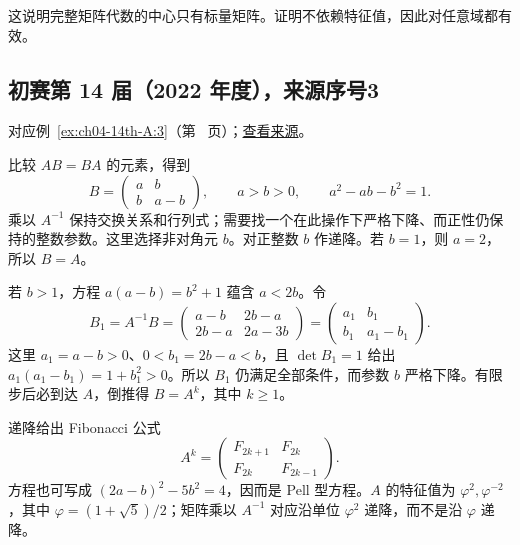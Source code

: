 \documentclass[UTF8,12pt,a4paper,fontset=fandol]{ctexart}
\begin{document}
\begin{remark}[方法与条件]

这说明完整矩阵代数的中心只有标量矩阵。证明不依赖特征值，因此对任意域都有效。

\end{remark}

\subsection{初赛第 14 届（2022 年度），来源序号3}\label{ans:ch04-14th-A:3}\label{pr:ch04-14th-A:3}

对应例~\ref{ex:ch04-14th-A:3}（第~\pageref{ex:ch04-14th-A:3} 页）；\href{https://github.com/lzxcr/cmc-mathematics/blob/64916fa1fdbc3e444a652eca204d5669058ee321/src/problems/preliminary/14/03.md}{查看来源}。

\begin{solve}

比较 $AB=BA$ 的元素，得到
\[
B=\begin{pmatrix}a&b\\b&a-b\end{pmatrix},\qquad
 a>b>0,\qquad a^2-ab-b^2=1.
\]
乘以 $A^{-1}$ 保持交换关系和行列式；需要找一个在此操作下严格下降、而正性仍保持的整数参数。这里选择非对角元 $b$。对正整数 $b$ 作递降。若 $b=1$，则 $a=2$，所以 $B=A$。

若 $b>1$，方程 $a(a-b)=b^2+1$ 蕴含 $a<2b$。令
\[
B_1=A^{-1}B
=\begin{pmatrix}a-b&2b-a\\2b-a&2a-3b\end{pmatrix}
=\begin{pmatrix}a_1&b_1\\b_1&a_1-b_1\end{pmatrix}.
\]
这里 $a_1=a-b>0$、$0<b_1=2b-a<b$，且 $\det B_1=1$ 给出 $a_1(a_1-b_1)=1+b_1^2>0$。所以 $B_1$ 仍满足全部条件，而参数 $b$ 严格下降。有限步后必到达 $A$，倒推得 $B=A^k$，其中 $k\geq1$。

\end{solve}

\begin{remark}[方法与条件]

递降给出 Fibonacci 公式
\[
A^k=\begin{pmatrix}F_{2k+1}&F_{2k}\\F_{2k}&F_{2k-1}\end{pmatrix}.
\]
方程也可写成 $(2a-b)^2-5b^2=4$，因而是 Pell 型方程。$A$ 的特征值为 $\varphi^2,\varphi^{-2}$，其中 $\varphi=(1+\sqrt5)/2$；矩阵乘以 $A^{-1}$ 对应沿单位 $\varphi^2$ 递降，而不是沿 $\varphi$ 递降。

\end{remark}
\end{document}
